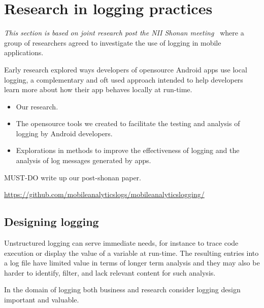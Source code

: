 \section{Research in logging practices}
\textit{This section is based on joint research post the NII Shonan meeting~\citep{nii_shonan_workshop_152}} where a group of researchers agreed to investigate the use of logging in mobile applications.

Early research explored ways developers of opensource Android apps use local logging, a complementary and oft used approach intended to help developers learn more about how their app behaves locally at run-time. 

\begin{itemize}
    \item Our research.
    \item The opensource tools we created to facilitate the testing and analysis of logging by Android developers.
    \item Explorations in methods to improve the effectiveness of logging and the analysis of log messages generated by apps.
\end{itemize}

MUST-DO write up our post-shonan paper.

\url{https://github.com/mobileanalyticslogs/mobileanalyticslogging/}


\subsection{Designing logging}
Unstructured logging can serve immediate needs, for instance to trace code execution or display the value of a variable at run-time. The resulting entries into a log file have limited value in terms of longer term analysis and they may also be harder to identify, filter, and lack relevant content for such analysis.

In the domain of logging both business and research consider logging design important and valuable. 

